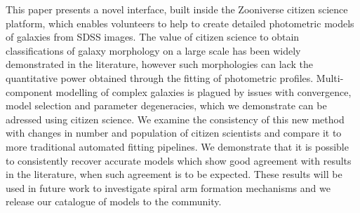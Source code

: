 \documentclass[../main.tex]{subfiles}
\begin{document}
This paper presents a novel interface, built inside the Zooniverse citizen science platform, which enables volunteers to help to create detailed photometric models of galaxies from SDSS images. The value of citizen science to obtain classifications of galaxy morphology on a large scale has been widely demonstrated in the literature, however such morphologies can lack the quantitative power obtained through the fitting of photometric profiles. Multi-component modelling of complex galaxies is plagued by issues with convergence, model selection and parameter degeneracies, which we demonstrate can be adressed using citizen science. We examine the consistency of this new method with changes in number and population of citizen scientists and compare it to more traditional automated fitting pipelines. We demonstrate that it is possible to consistently recover accurate models which show good agreement with results in the literature, when such agreement is to be expected. These results will be used in future work to investigate spiral arm formation mechanisms and we release our catalogue of models to the community.
\end{document}

